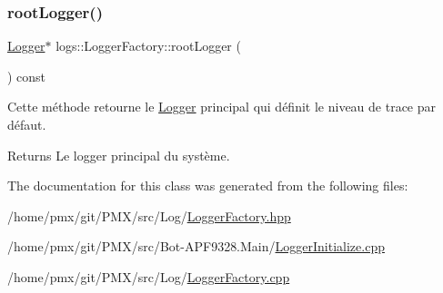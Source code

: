 \subsubsection{\texorpdfstring{root\+Logger()}{rootLogger()}}
{\footnotesize\ttfamily \hyperlink{classlogs_1_1Logger}{Logger}$\ast$ logs\+::\+Logger\+Factory\+::root\+Logger (\begin{DoxyParamCaption}{ }\end{DoxyParamCaption}) const\hspace{0.3cm}{\ttfamily [inline]}}



Cette méthode retourne le \hyperlink{classlogs_1_1Logger}{Logger} principal qui définit le niveau de trace par défaut. 

\begin{DoxyReturn}{Returns}
Le logger principal du système. 
\end{DoxyReturn}


The documentation for this class was generated from the following files\+:\begin{DoxyCompactItemize}
\item 
/home/pmx/git/\+P\+M\+X/src/\+Log/\hyperlink{LoggerFactory_8hpp}{Logger\+Factory.\+hpp}\item 
/home/pmx/git/\+P\+M\+X/src/\+Bot-\/\+A\+P\+F9328.\+Main/\hyperlink{Bot-APF9328_8Main_2LoggerInitialize_8cpp}{Logger\+Initialize.\+cpp}\item 
/home/pmx/git/\+P\+M\+X/src/\+Log/\hyperlink{LoggerFactory_8cpp}{Logger\+Factory.\+cpp}\end{DoxyCompactItemize}
